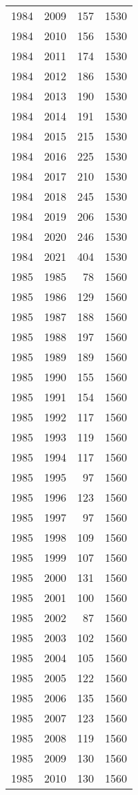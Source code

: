 \documentclass[
  10pt,
  letterpaper,
  DIV=11,
  numbers=noendperiod,
  twoside]{scrartcl}
\begin{document}
\begin{longtable}[]{@{}rrrr@{}}
1984 & 2009 & 157 & 1530 \\
1984 & 2010 & 156 & 1530 \\
1984 & 2011 & 174 & 1530 \\
1984 & 2012 & 186 & 1530 \\
1984 & 2013 & 190 & 1530 \\
1984 & 2014 & 191 & 1530 \\
1984 & 2015 & 215 & 1530 \\
1984 & 2016 & 225 & 1530 \\
1984 & 2017 & 210 & 1530 \\
1984 & 2018 & 245 & 1530 \\
1984 & 2019 & 206 & 1530 \\
1984 & 2020 & 246 & 1530 \\
1984 & 2021 & 404 & 1530 \\
1985 & 1985 & 78 & 1560 \\
1985 & 1986 & 129 & 1560 \\
1985 & 1987 & 188 & 1560 \\
1985 & 1988 & 197 & 1560 \\
1985 & 1989 & 189 & 1560 \\
1985 & 1990 & 155 & 1560 \\
1985 & 1991 & 154 & 1560 \\
1985 & 1992 & 117 & 1560 \\
1985 & 1993 & 119 & 1560 \\
1985 & 1994 & 117 & 1560 \\
1985 & 1995 & 97 & 1560 \\
1985 & 1996 & 123 & 1560 \\
1985 & 1997 & 97 & 1560 \\
1985 & 1998 & 109 & 1560 \\
1985 & 1999 & 107 & 1560 \\
1985 & 2000 & 131 & 1560 \\
1985 & 2001 & 100 & 1560 \\
1985 & 2002 & 87 & 1560 \\
1985 & 2003 & 102 & 1560 \\
1985 & 2004 & 105 & 1560 \\
1985 & 2005 & 122 & 1560 \\
1985 & 2006 & 135 & 1560 \\
1985 & 2007 & 123 & 1560 \\
1985 & 2008 & 119 & 1560 \\
1985 & 2009 & 130 & 1560 \\
1985 & 2010 & 130 & 1560 \\

\end{longtable}
\end{document}
